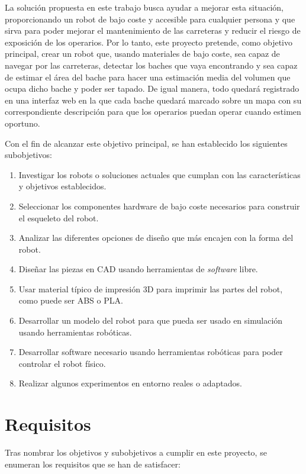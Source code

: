 La solución propuesta en este trabajo busca ayudar a mejorar esta situación, proporcionando un robot de bajo coste y accesible para cualquier persona y que sirva para poder mejorar el mantenimiento de las carreteras y reducir el riesgo de exposición de los operarios. Por lo tanto, este proyecto pretende, como objetivo principal, crear un robot que, usando materiales de bajo coste, sea capaz de navegar por las carreteras, detectar los baches que vaya encontrando y sea capaz de estimar el área del bache para hacer una estimación media del volumen que ocupa dicho bache y poder ser tapado. De igual manera, todo quedará registrado en una interfaz web en la que cada bache quedará marcado sobre un mapa con su correspondiente descripción para que los operarios puedan operar cuando estimen oportuno.

Con el fin de alcanzar este objetivo principal, se han establecido los siguientes subobjetivos:

\begin{enumerate}
	\item{} Investigar los robots o soluciones actuales que cumplan con las características y objetivos establecidos.
	\item{} Seleccionar los componentes hardware de bajo coste necesarios para construir el esqueleto del robot.
	\item{} Analizar las diferentes opciones de diseño que más encajen con la forma del robot.
	\item{} Diseñar las piezas en \acs{CAD} usando herramientas de \textit{software} libre.
	\item{} Usar material típico de impresión 3D para imprimir las partes del robot, como puede ser ABS o PLA. 
	\item{} Desarrollar un modelo del robot para que pueda ser usado en simulación usando herramientas robóticas. 
	\item{} Desarrollar software necesario usando herramientas robóticas para poder controlar el robot físico. 
	\item{} Realizar algunos experimentos en entorno reales o adaptados.  
\end{enumerate}
 

\section{Requisitos}
\label{sec:requisitos}

Tras nombrar los objetivos y subobjetivos a cumplir en este proyecto, se enumeran los requisitos que se han de satisfacer: 

